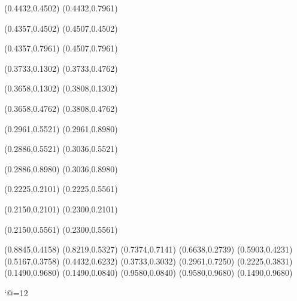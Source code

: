 \PST@Solid(0.4432,0.4502)
(0.4432,0.7961)

\PST@Solid(0.4357,0.4502)
(0.4507,0.4502)

\PST@Solid(0.4357,0.7961)
(0.4507,0.7961)

\PST@Solid(0.3733,0.1302)
(0.3733,0.4762)

\PST@Solid(0.3658,0.1302)
(0.3808,0.1302)

\PST@Solid(0.3658,0.4762)
(0.3808,0.4762)

\PST@Solid(0.2961,0.5521)
(0.2961,0.8980)

\PST@Solid(0.2886,0.5521)
(0.3036,0.5521)

\PST@Solid(0.2886,0.8980)
(0.3036,0.8980)

\PST@Solid(0.2225,0.2101)
(0.2225,0.5561)

\PST@Solid(0.2150,0.2101)
(0.2300,0.2101)

\PST@Solid(0.2150,0.5561)
(0.2300,0.5561)

\PST@Diamond(0.8845,0.4158)
\PST@Diamond(0.8219,0.5327)
\PST@Diamond(0.7374,0.7141)
\PST@Diamond(0.6638,0.2739)
\PST@Diamond(0.5903,0.4231)
\PST@Diamond(0.5167,0.3758)
\PST@Diamond(0.4432,0.6232)
\PST@Diamond(0.3733,0.3032)
\PST@Diamond(0.2961,0.7250)
\PST@Diamond(0.2225,0.3831)
\PST@Border(0.1490,0.9680)
(0.1490,0.0840)
(0.9580,0.0840)
(0.9580,0.9680)
(0.1490,0.9680)

\catcode`@=12
\fi
\endpspicture

